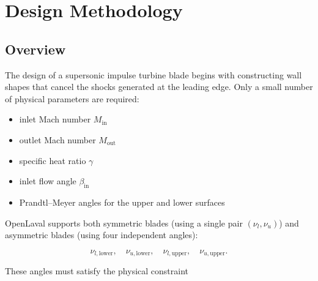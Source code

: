 \chapter{Design Methodology}
\begin{abstract}

This document summarizes the design procedure for supersonic impulse turbine blades,
based on classical shock–expansion theory and the method of characteristics.
The accompanying program, OpenLaval, implements this procedure and supports
both symmetric and asymmetric blade geometries by allowing independent
Prandtl–Meyer angles for the upper and lower surfaces.

In an asymmetric blade, the upper and lower surfaces undergo different amounts
of expansion, resulting in different R$^\ast$ values, different characteristic
curves, and different arc segments. This chapter describes the complete design
workflow, including the asymmetric formulation now supported by the software.

\end{abstract}

\section{Overview}

The design of a supersonic impulse turbine blade begins with constructing
wall shapes that cancel the shocks generated at the leading edge.
Only a small number of physical parameters are required:

\begin{itemize}
  \item inlet Mach number $M_{\mathrm{in}}$
  \item outlet Mach number $M_{\mathrm{out}}$
  \item specific heat ratio $\gamma$
  \item inlet flow angle $\beta_{\mathrm{in}}$
  \item Prandtl–Meyer angles for the upper and lower surfaces
\end{itemize}

OpenLaval supports both symmetric blades
(using a single pair $(\nu_l, \nu_u)$)
and asymmetric blades
(using four independent angles):


\[
\nu_{l,\mathrm{lower}},\quad
\nu_{u,\mathrm{lower}},\quad
\nu_{l,\mathrm{upper}},\quad
\nu_{u,\mathrm{upper}}.
\]



These angles must satisfy the physical constraint


